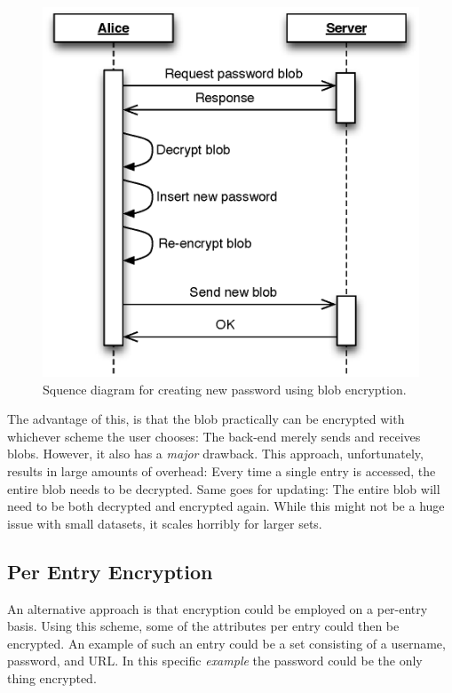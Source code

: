 			\begin{figure}[h!]
				\centering
				\includegraphics[width=\textwidth]{figures/design/uml/sequence/blob.eps}
				\caption{Squence diagram for creating new password using blob encryption.}
				\label{fig:seq_blob}
			\end{figure}

			The advantage of this, is that the blob practically can be encrypted with whichever scheme the user chooses: The back-end merely sends and receives blobs. However, it also has a \emph{major} drawback. This approach, unfortunately, results in large amounts of overhead: Every time a single entry is accessed, the entire blob needs to be decrypted. Same goes for updating: The entire blob will need to be both decrypted and encrypted again. While this might not be a huge issue with small datasets, it scales horribly for larger sets.

		\subsection{Per Entry Encryption}
			An alternative approach is that encryption could be employed on a per-entry basis. Using this scheme, some of the attributes per entry could then be encrypted. An example of such an entry could be a set consisting of a username, password, and URL. In this specific \emph{example} the password could be the only thing encrypted. 

